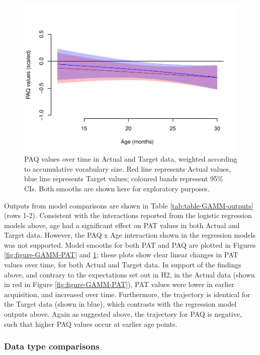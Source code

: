 \documentclass[
  man,mask,floatsintext]{apa6}
\begin{document}
\begin{figure}
\centering
\includegraphics{PhonNetworksProj-anon_files/figure-latex/figure-GAMM-PAQ-1.pdf}
\caption{\label{fig:figure-GAMM-PAQ}PAQ values over time in Actual and Target data, weighted according to accumulative vocabulary size. Red line represents Actual values, blue line represents Target values; coloured bands represent 95\% CIs. Both smooths are shown here for exploratory purposes.}
\end{figure}

Outputs from model comparisons are shown in Table \ref{tab:table-GAMM-outputs} (rows 1-2). Consistent with the interactions reported from the logistic regression models above, age had a significant effect on PAT values in both Actual and Target data. However, the PAQ x Age interaction shown in the regression models was not supported. Model smooths for both PAT and PAQ are plotted in Figures \ref{fig:figure-GAMM-PAT} and \ref{fig:figure-GAMM-PAQ}; these plots show clear linear changes in PAT values over time, for both Actual and Target data. In support of the findings above, and contrary to the expectations set out in H2, in the Actual data (shown in red in Figure \ref{fig:figure-GAMM-PAT}), PAT values were lower in earlier acquisition, and increased over time. Furthermore, the trajectory is identical for the Target data (shown in blue), which contrasts with the regression model outputs above. Again as suggested above, the trajectory for PAQ is negative, such that higher PAQ values occur at earlier age points.

\hypertarget{data-type-comparisons}{%
\subsubsection{Data type comparisons}\label{data-type-comparisons}}
\end{document}
